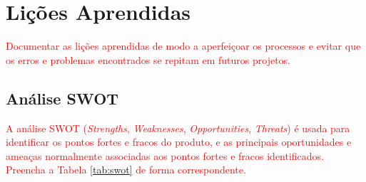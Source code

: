 \chapter{Lições Aprendidas}

\textcolor{red}{Documentar as lições aprendidas de modo a aperfeiçoar os processos e evitar que os erros e problemas encontrados se repitam em futuros projetos.}

\section{Análise SWOT}

\textcolor{red}{A análise SWOT (\textit{Strengths}, \textit{Weaknesses}, \textit{Opportunities}, \textit{Threats}) é usada para identificar os pontos fortes e fracos do produto, e as principais oportunidades e ameaças normalmente associadas aos pontos fortes e fracos identificados. Preencha a Tabela \ref{tab:swot} de forma correspondente.}

